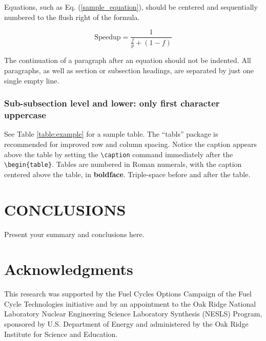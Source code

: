 \documentclass{anstrans}
\begin{document}
Equations, such as Eq. (\ref{sample_equation}), should be centered and 
sequentially numbered to the flush right of the formula.

\begin{equation}
  \label{sample_equation}
  \mathrm{Speedup}=\frac{1}{\frac{f}{p}+(1-f)}
\end{equation}

The continuation of a paragraph after an equation should not be indented.  
All paragraphs, as well as section or subsection headings, are separated by 
just one single empty line.

\subsubsection{Sub-subsection level and lower: only first character uppercase}

See Table \ref{table:example} for a sample table.  The ``tabls'' package is
recommended for improved row and column spacing.  Notice the caption appears 
above the table by setting the \verb!\caption! command immediately 
after the \verb!\begin{table}!. Tables are numbered in Roman 
numerals, with the caption centered above the table, in \textbf{boldface}.  
Triple-space before and after the table.

\section{CONCLUSIONS}

Present your summary and conclusions here.
\section{Acknowledgments}
This research was supported by the Fuel Cycles Options Campaign of the Fuel Cycle Technologies initiative 
and by an appointment to the Oak Ridge National Laboratory Nuclear Engineering Science Laboratory Synthesis (NESLS) Program, sponsored by U.S. Department of Energy and administered by the Oak Ridge Institute for Science and Education.



\end{document}
